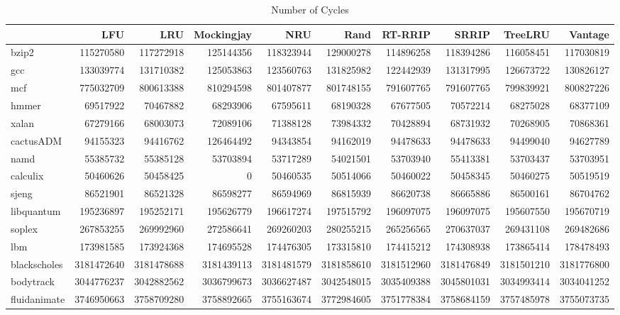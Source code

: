 \begin{table}
\caption{Number of Cycles}
\label{tab:numOfCycles}
\begin{tabular}{lrrrrrrrrr}
\toprule
 & LFU & LRU & Mockingjay & NRU & Rand & RT-RRIP & SRRIP & TreeLRU & Vantage \\
\midrule
bzip2 & 115270580 & 117272918 & 125144356 & 118323944 & 129000278 & 114896258 & 118394286 & 116058451 & 117030819 \\
gcc & 133039774 & 131710382 & 125053863 & 123560763 & 131825982 & 122442939 & 131317995 & 126673722 & 130826127 \\
mcf & 775032709 & 800613388 & 810294598 & 801407877 & 801748155 & 791607765 & 791607765 & 799839921 & 800827226 \\
hmmer & 69517922 & 70467882 & 68293906 & 67595611 & 68190328 & 67677505 & 70572214 & 68275028 & 68377109 \\
xalan & 67279166 & 68003073 & 72089106 & 71388128 & 73984332 & 70428894 & 68731932 & 70268905 & 70868361 \\
cactusADM & 94155323 & 94416762 & 126464492 & 94343854 & 94162019 & 94478633 & 94478633 & 94499040 & 94627789 \\
namd & 55385732 & 55385128 & 53703894 & 53717289 & 54021501 & 53703940 & 55413381 & 53703437 & 53703951 \\
calculix & 50460626 & 50458425 & 0 & 50460535 & 50514066 & 50460022 & 50458345 & 50460275 & 50519519 \\
sjeng & 86521901 & 86521328 & 86598277 & 86594969 & 86815939 & 86620738 & 86665886 & 86500161 & 86704762 \\
libquantum & 195236897 & 195252171 & 195626779 & 196617274 & 197515792 & 196097075 & 196097075 & 195607550 & 195670719 \\
soplex & 267853255 & 269992960 & 272586641 & 269260203 & 280255215 & 265256565 & 270637037 & 269431108 & 269482686 \\
lbm & 173981585 & 173924368 & 174695528 & 174476305 & 173315810 & 174415212 & 174308938 & 173865414 & 178478493 \\
blackscholes & 3181472640 & 3181478688 & 3181439113 & 3181481579 & 3181858610 & 3181512960 & 3181476849 & 3181501210 & 3181776800 \\
bodytrack & 3044776237 & 3042882562 & 3036799673 & 3036627487 & 3042548015 & 3035409388 & 3045801031 & 3034993414 & 3034041252 \\
fluidanimate & 3746950663 & 3758709280 & 3758892665 & 3755163674 & 3772984605 & 3751778384 & 3758684159 & 3757485978 & 3755073735 \\

\end{tabular}
\end{table}
